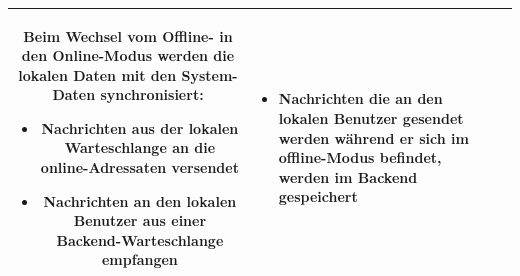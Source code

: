 \begin{table}[H]
\begin{adjustwidth}{-1.7cm}{1.7cm}
\begin{tabulary}{18cm}{|C|M|M|}
Beim Wechsel vom Offline- in den Online-Modus werden die lokalen Daten mit den System-Daten synchronisiert:
\begin{itemize}[leftmargin=*,noitemsep,topsep=1ex,parsep=0pt,partopsep=0pt]
	\item Nachrichten aus der lokalen Warteschlange an die online-Adressaten versendet
	\item Nachrichten an den lokalen Benutzer aus einer Backend-Warteschlange empfangen
\end{itemize}
				\endgroup
&%
				\begingroup
    				\fontsize{9pt}{10pt}\selectfont
\begin{itemize}[leftmargin=*,noitemsep,topsep=1ex,parsep=0pt,partopsep=0pt]
	\item Nachrichten die an den lokalen Benutzer gesendet werden während er sich im offline-Modus befindet, werden im Backend gespeichert
\end{itemize}
				\endgroup
\\ \hline
		\end{tabulary}
  		\end{adjustwidth}
	\end{table}
